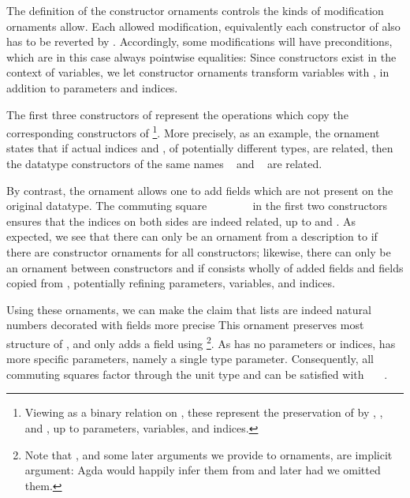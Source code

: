 The definition of the constructor ornaments  controls the kinds of modification ornaments allow. Each allowed modification, equivalently each constructor of  also has to be reverted by . Accordingly, some modifications will have preconditions, which are in this case always pointwise equalities:
Since constructors exist in the context of variables, we let constructor ornaments transform variables with , in addition to parameters and indices.

The first three constructors of  represent the operations which copy the corresponding constructors of \footnote{Viewing  as a binary relation on , these represent the preservation of  by , , and , up to parameters, variables, and indices.}. More precisely, as an example, the ornament  states that if actual indices  and , of potentially different types, are related, then the datatype constructors of the same names \  and \  are related.

By contrast, the  ornament allows one to add fields which are not present on the original datatype.
The commuting square \ \ \ \ \ \ \  in the first two constructors ensures that the indices on both sides are indeed related, up to  and . As expected, we see that there can only be an ornament from a description  to  if there are constructor ornaments for all constructors; likewise, there can only be an ornament between constructors  and  if  consists wholly of added fields and fields copied from , potentially refining parameters, variables, and indices.

Using these ornaments, we can make the claim that lists are indeed natural numbers decorated with fields more precise
This ornament preserves most structure of \bN{}, and only adds a field  using \footnote{Note that , and some later arguments we provide to ornaments, are implicit argument: Agda would happily infer them from  and later  had we omitted them.}. As \bN{} has no parameters or indices,  has more specific parameters, namely a single type parameter. Consequently, all commuting squares factor through the unit type and can be satisfied with \ \AV{\_}\ \ . 

